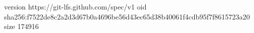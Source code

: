 version https://git-lfs.github.com/spec/v1
oid sha256:f7522de8c2a2d3d67b0a4696be56d43ec65d38b40061f4cdb95f7f8615723a20
size 174916
